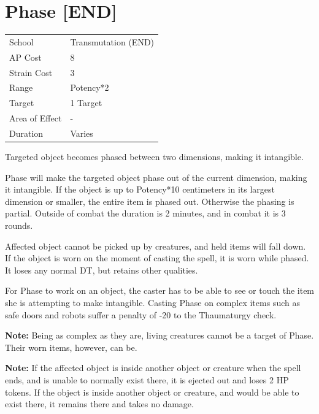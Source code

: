 \documentclass[11pt,a4paper,twocolumn]{book}
\begin{document}
\section*{Phase [END]}
{
	\begin{tabu} to 75mm{| X[l,4] | X[l,7] |}
		\hline
		School 			& Transmutation (END) 		\\
        AP Cost	      	& 8 						\\
        Strain Cost     & 3						\\
        Range     		& Potency*2					\\
        Target      	& 1 Target				\\
        Area of Effect  & -  	 			\\
        Duration     	& Varies			\\ \hline
	\end{tabu}
		
}

\medskip

Targeted object becomes phased between two dimensions, making it intangible.

Phase will make the targeted object phase out of the current dimension, making it intangible. If the object is up to Potency*10 centimeters in its largest dimension or smaller, the entire item is phased out. Otherwise the phasing is partial. Outside of combat the duration is 2 minutes, and in combat it is 3 rounds.

Affected object cannot be picked up by creatures, and held items will fall down. If the object is worn on the moment of casting the spell, it is worn while phased. It loses any normal DT, but retains other qualities.

For Phase to work on an object, the caster has to be able to see or touch the item she is attempting to make intangible. Casting Phase on complex items such as safe doors and robots suffer a penalty of -20 to the Thaumaturgy check.

\textbf{Note:} Being as complex as they are, living creatures cannot be a target of Phase. Their worn items, however, can be.

\textbf{Note:} If the affected object is inside another object or creature when the spell ends, and is unable to normally exist there, it is ejected out and loses 2 HP tokens. If the object is inside another object or creature, and would be able to exist there, it remains there and takes no damage.
\end{document}
